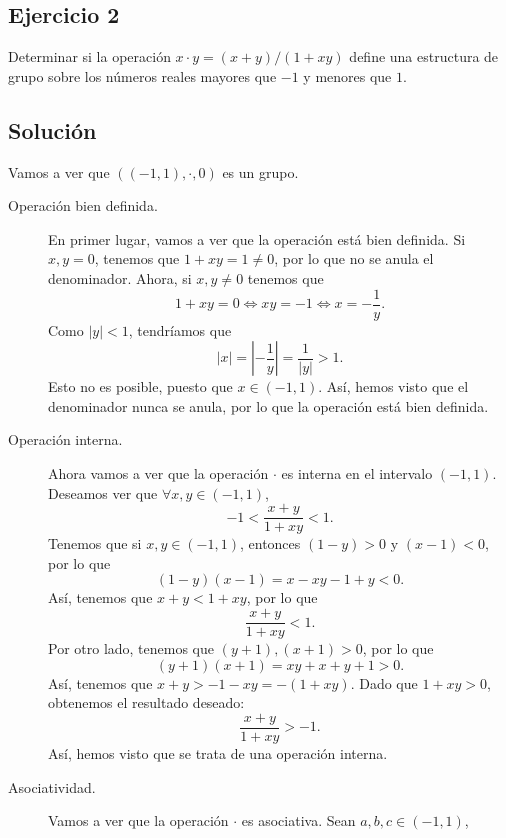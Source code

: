 \documentclass{article}
\begin{document}
\subsection*{Ejercicio 2}
Determinar si la operación $\displaystyle x \cdot y = \left(x+y\right)/ \left(1 + xy\right) $ define una estructura de grupo sobre los números reales mayores que $\displaystyle - 1 $ y menores que $\displaystyle 1 $.
\subsection*{Solución}
Vamos a ver que $\displaystyle \left(\left(-1,1\right), \cdot, 0 \right) $ es un grupo. 
\begin{description}
\item[Operación bien definida.] En primer lugar, vamos a ver que la operación está bien definida. Si $\displaystyle x,y = 0 $, tenemos que $\displaystyle 1 +xy = 1 \neq 0 $, por lo que no se anula el denominador. Ahora, si $\displaystyle x,y \neq 0 $ tenemos que
\[1 + xy = 0 \iff xy = -1 \iff x = -\frac{1}{y} .\]
Como $\displaystyle \left|y\right|< 1 $, tendríamos que
\[ \left|x\right| = \left|-\frac{1}{y}\right| = \frac{1}{ \left|y\right|} > 1 .\]
Esto no es posible, puesto que $\displaystyle x \in \left(-1,1\right) $. Así, hemos visto que el denominador nunca se anula, por lo que la operación está bien definida.
\item[Operación interna.] Ahora vamos a ver que la operación $\displaystyle \cdot  $ es interna en el intervalo $\displaystyle \left(-1,1\right) $. Deseamos ver que $\displaystyle \forall x,y \in \left(-1,1\right) $,
\[-1 < \frac{x + y}{1 + xy} < 1 .\]
Tenemos que si $\displaystyle x,y \in \left(-1,1\right) $, entonces $\displaystyle \left(1-y\right) > 0 $ y $\displaystyle \left(x-1\right) < 0 $, por lo que 
\[\left(1-y\right)\left(x-1\right) = x -xy-1+y < 0 .\]
Así, tenemos que $\displaystyle x +y < 1 + xy $, por lo que 
\[\frac{x+y}{1 + xy} < 1 .\]
Por otro lado, tenemos que $\displaystyle \left(y+1\right), \left(x+1\right) > 0 $, por lo que 
\[\left(y+1\right)\left(x+1\right) = xy+x +y +1 > 0 .\]
Así, tenemos que $\displaystyle x+y > -1-xy = -\left(1+xy\right)$. Dado que $\displaystyle 1 +xy > 0 $, obtenemos el resultado deseado:
\[\frac{x+y}{1 +xy} > -1 .\]
Así, hemos visto que se trata de una operación interna.
\item[Asociatividad.] Vamos a ver que la operación $\displaystyle \cdot  $ es asociativa. Sean $\displaystyle a,b, c \in \left(-1,1\right) $,
	\[
	\begin{split}

\end{split}\]
\end{description}
\end{document}
